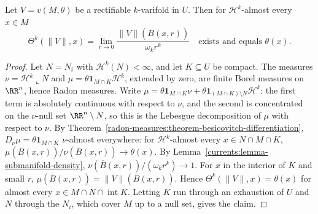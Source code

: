 \begin{theorem}\label{currents:theorem-rectifiable-density}
Let $V = v(M, \theta)$ be a rectifiable $k$-varifold in $U$. Then for $\mathcal{H}^k$-almost every $x \in M$
\[
\Theta^k(\|V\|, x) = \lim_{r \to 0}\frac{\|V\|(\overline{B}(x, r))}{\omega_kr^k} \quad\text{exists and equals } \theta(x).
\]
\end{theorem}

\begin{proof}
Let $N = N_i$ with $\mathcal{H}^k(N) < \infty$, and let $K \subseteq U$ be compact. The measures $\nu = \mathcal{H}^k\llcorner N$ and $\mu = \theta\mathbf{1}_{M \cap K}\mathcal{H}^k$, extended by zero, are finite Borel
measures on $\RR^n$, hence Radon measures. Write $\mu = \theta\mathbf{1}_{M \cap K}\nu + \theta\mathbf{1}_{(M \cap K) \setminus N}\mathcal{H}^k$: the first term is absolutely continuous with respect to $\nu$, and
the second is concentrated on the $\nu$-null set $\RR^n \setminus N$, so this is the Lebesgue decomposition of $\mu$ with respect to $\nu$. By
Theorem~\ref{radon-measures:theorem-besicovitch-differentiation}, $D_\nu\mu = \theta\mathbf{1}_{M \cap K}$ $\nu$-almost everywhere: for $\mathcal{H}^k$-almost every $x \in N \cap M \cap K$,
$\mu(\overline{B}(x, r))/\nu(\overline{B}(x, r)) \to \theta(x)$. By Lemma~\ref{currents:lemma-submanifold-density}, $\nu(\overline{B}(x, r))/(\omega_kr^k) \to 1$. For $x$ in the interior of $K$ and small $r$,
$\mu(\overline{B}(x, r)) = \|V\|(\overline{B}(x, r))$. Hence $\Theta^k(\|V\|, x) = \theta(x)$ for almost every $x \in M \cap N \cap \operatorname{int}K$. Letting $K$ run through an exhaustion of $U$ and $N$ through the
$N_i$, which cover $M$ up to a null set, gives the claim.
\end{proof}

